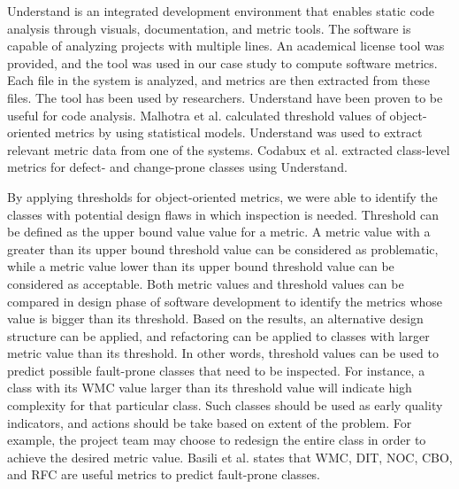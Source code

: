 Understand is an integrated development environment that enables static code analysis through visuals, documentation, and metric tools. The software is capable of analyzing projects with multiple lines. An academical license tool was provided, and the tool was used in our case study to compute software metrics. Each file in the system is analyzed, and metrics are then extracted from these files. The tool has been used by researchers. Understand have been proven to be useful for code analysis. Malhotra et al.\cite{malhotra2015fault} calculated threshold values of object-oriented metrics by using statistical models. Understand was used to extract relevant metric data from one of the systems. Codabux et al.\cite{codabux2016technical} extracted class-level metrics for defect- and change-prone classes using Understand.

By applying thresholds for object-oriented metrics, we were able to identify the classes with potential design flaws in which inspection is needed. Threshold can be defined as the upper bound value value for a metric. A metric value with a greater than its upper bound threshold value can be considered as problematic, while a metric value lower than its upper bound threshold value can be considered as acceptable. Both metric values and threshold values can be compared in design phase of software development to identify the metrics whose value is bigger than its threshold. Based on the results, an alternative design structure can be applied, and refactoring can be applied to classes with larger metric value than its threshold. In other words, threshold values can be used to predict possible fault-prone classes that need to be inspected. For instance, a class with its WMC value larger than its threshold value will indicate high complexity for that particular class. Such classes should be used as early quality indicators, and actions should be take based on extent of the problem. For example, the project team may choose to redesign the entire class in order to achieve the desired metric value. Basili et al.\cite{basili1996validation} states that WMC, DIT, NOC, CBO, and RFC are useful metrics to predict fault-prone classes. 




